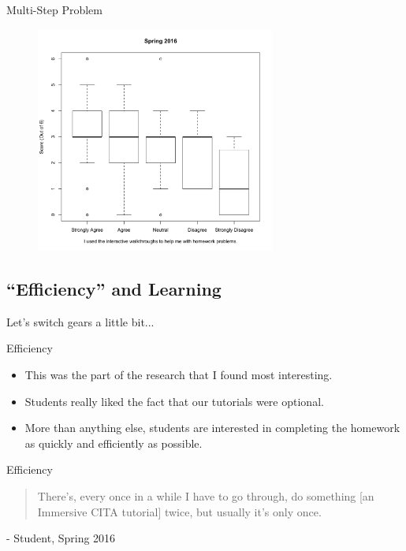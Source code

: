 \documentclass[xcolor=x11names,compress]{beamer}
\begin{document}
\begin{frame}{Multi-Step Problem}
	\begin{figure}
		\includegraphics[width=0.7\textwidth]{img/multi-step_vs_reported_use.pdf}
	\end{figure}
\end{frame}

\subsection{``Efficiency'' and Learning}

\begin{frame}
	\begin{center}
		Let's switch gears a little bit...
	\end{center}
\end{frame}

\begin{frame}{Efficiency}
	\begin{itemize}
		\item This was the part of the research that I found most interesting.
		\item Students really liked the fact that our tutorials were optional.
		\item More than anything else, students are interested in completing the homework as quickly and efficiently as possible.
	\end{itemize}
\end{frame}

\begin{frame}{Efficiency}
	\begin{quote}
		There's, every once in a while I have to go through, do something [an Immersive CITA tutorial] twice, but usually it's only once.
	\end{quote}
	\vspace{5mm}
	- Student, Spring 2016
\end{frame}
\end{document}
